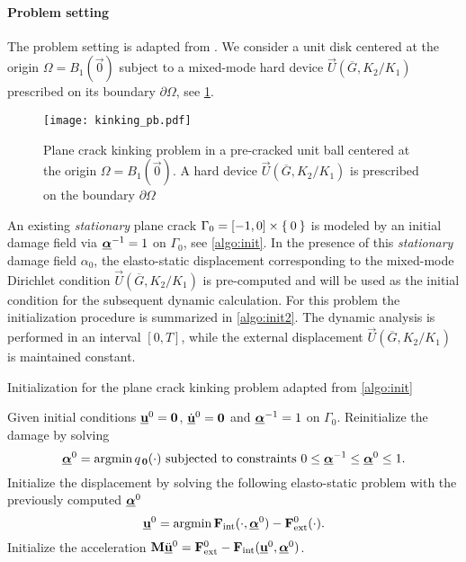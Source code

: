 \paragraph{Problem setting} The problem setting is adapted from \cite{HakimKarma:2005,HakimKarma:2009}. We consider a unit disk centered at the origin $\Omega=B_1(\vec{0})$ subject to a mixed-mode hard device $\vec{U}(\overline{G},K_2/K_1)$ prescribed on its boundary $\partial\Omega$, see \cref{fig:kinking}.
\begin{figure}[htbp]
\centering
\texttt{[image: kinking\_pb.pdf]}
\caption{Plane crack kinking problem in a pre-cracked unit ball centered at the origin $\Omega=B_1(\vec{0})$. A hard device $\vec{U}(\overline{G},K_2/K_1)$ is prescribed on the boundary $\partial\Omega$} \label{fig:kinking}
\end{figure}
An existing \emph{stationary} plane crack $\Gamma_0=[-1,0]\times\Set{0}$ is modeled by an initial damage field via $\dvec^{-1}=1$ on $\Gamma_0$, see \cref{algo:init}. In the presence of this \emph{stationary} damage field $\alpha_0$, the elasto-static displacement corresponding to the mixed-mode Dirichlet condition $\vec{U}(\overline{G},K_2/K_1)$ is pre-computed and will be used as the initial condition for the subsequent dynamic calculation. For this problem the initialization procedure is summarized in \cref{algo:init2}. The dynamic analysis is performed in an interval $[0,T]$, while the external displacement $\vec{U}(\overline{G},K_2/K_1)$ is maintained constant.
\begin{algorithm}[htbp]
\caption{Initialization for the plane crack kinking problem adapted from \cref{algo:init}} \label{algo:init2}
\begin{algorithmic}[1]\linespread{1.2}\selectfont\normalsize
\State Given initial conditions $\uvec^0=\vec{0}$, $\dot{\uvec}^0=\vec{0}$ and $\dvec^{-1}=1$ on $\Gamma_0$.
\State Reinitialize the damage by solving
\[
\dvec^0=\operatorname{arg min}q_{\,\vec{0}}(\cdot)\text{ subjected to constraints $0\leq\dvec^{-1}\leq\dvec^0\leq 1$}.
\]
\State Initialize the displacement by solving the following elasto-static problem with the previously computed $\dvec^0$
\[
\uvec^0=\operatorname{arg min}\vec{F}_\mathrm{int}(\cdot,\dvec^0)-\vec{F}_\mathrm{ext}^0(\cdot).
\]
\State Initialize the acceleration $\vec{M}\ddot{\uvec}^0=\vec{F}_\mathrm{ext}^0-\vec{F}_\mathrm{int}(\uvec^0,\dvec^0)$.
\end{algorithmic}
\end{algorithm}

